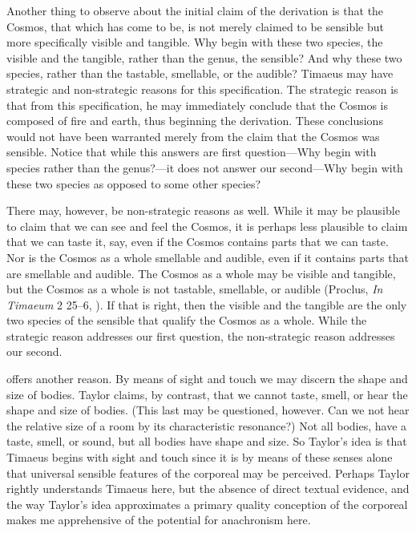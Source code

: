 
Another thing to observe about the initial claim of the derivation is that the Cosmos, that which has come to be, is not merely claimed to be sensible but more specifically visible and tangible. Why begin with these two species, the visible and the tangible, rather than the genus, the sensible? And why these two species, rather than the tastable, smellable, or the audible?  Timaeus may have strategic and non-strategic reasons for this specification. The strategic reason is that from this specification, he may immediately conclude that the Cosmos is composed of fire and earth, thus beginning the derivation. These conclusions would not have been warranted merely from the claim that the Cosmos was sensible. Notice that while this answers are first question---Why begin with species rather than the genus?---it does not answer our second---Why begin with these two species as opposed to some other species? 

There may, however, be non-strategic reasons as well. While it may be plausible to claim that we can see and feel the Cosmos, it is perhaps less plausible to claim that we can taste it, say, even if the Cosmos contains parts that we can taste. Nor is the Cosmos as a whole smellable and audible, even if it contains parts that are smellable and audible. The Cosmos as a whole may be visible and tangible, but the Cosmos as a whole is not tastable, smellable, or audible (Proclus, \emph{In Timaeum} 2 25--6, \citealt{Diehl:1903re}). If that is right, then the visible and the tangible are the only two species of the sensible that qualify the Cosmos as a whole. While the strategic reason addresses our first question, the non-strategic reason addresses our second. 

\citet[93]{Taylor:1928qb} offers another reason. By means of sight and touch we may discern the shape and size of bodies. Taylor claims, by contrast, that we cannot taste, smell, or hear the shape and size of bodies. (This last may be questioned, however. Can we not hear the relative size of a room by its characteristic resonance?) Not all bodies, have a taste, smell, or sound, but all bodies have shape and size. So Taylor's idea is that Timaeus begins with sight and touch since it is by means of these senses alone that universal sensible features of the corporeal may be perceived. Perhaps Taylor rightly understands Timaeus here, but the absence of direct textual evidence, and the way Taylor's idea approximates a primary quality conception of the corporeal makes me apprehensive of the potential for anachronism here.

